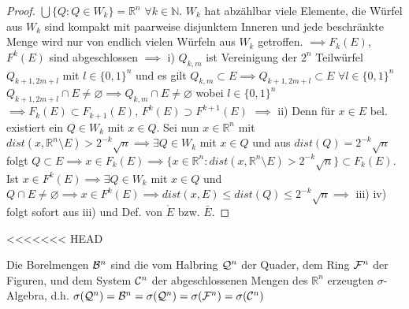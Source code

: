   \begin{proof}
    $\bigcup\{Q:Q\in W_k\} = \mathbb{R}^n$ $\forall k\in\mathbb{N}$. \newline
    $W_k$ hat abzählbar viele Elemente, die Würfel aus $W_k$ sind kompakt mit paarweise disjunktem Inneren und jede beschränkte Menge wird nur von endlich vielen Würfeln aus $W_k$ getroffen. $\implies F_k(E)$, $F^k(E)$ sind abgeschlossen $\implies$ i) \newline
    $Q_{k,m}$ ist Vereinigung der $2^n$ Teilwürfel $Q_{k+1, 2m+l}$ mit $l\in \{0,1\}^n$ und es gilt \newline $Q_{k,m} \subset E \implies Q_{k+1, 2m+l} \subset E$ $\forall l\in\{0,1\}^n$ \newline
    $Q_{k+1,2m+l} \cap E \neq \varnothing \implies Q_{k,m} \cap E \neq \varnothing$ wobei $l\in\{0,1\}^n$ \newline
    $\implies F_k(E) \subset F_{k+1}(E)$, $F^k(E) \supset F^{k+1}(E)$ $\implies$ ii) \newline
    Denn für $x \in E$ bel. existiert ein $Q\in W_k$ mit $x\in Q$. \newline
    Sei nun $x\in\mathbb{R}^n$ mit $dist(x,\mathbb{R}^n\setminus E) > 2^{-k}\sqrt{n} \implies \exists Q\in W_k$ mit $x\in Q$ und aus $dist(Q) = 2^{-k}\sqrt{n}$ folgt $Q\subset E \implies x\in F_k(E)\implies \{x\in\mathbb{R}^n: dist(x,\mathbb{R}^n\setminus E) > 2^{-k}\sqrt{n}\} \subset F_k(E)$. \newline
    Ist $x\in F^k(E) \implies \exists Q\in W_k$ mit $x\in Q$ und $Q \cap E \neq \varnothing \implies x\in F^k(E) \implies dist(x,E) \leq dist(Q) \leq 2^{-k}\sqrt{n} \implies$ iii) \newline
    iv) folgt sofort aus iii) und Def. von $\mathring{E}$ bzw. $\bar{E}$. 
    
  \end{proof}

<<<<<<< HEAD
\begin{lemma}
	Die Borelmengen $\mathcal{B}^n$ sind die vom Halbring $\mathcal{Q}^n$ der Quader, dem Ring $\mathcal{F}^n$ der Figuren, und dem System $\mathcal{C}^n$ der abgeschlossenen Mengen des $\mathbb{R}^n$ erzeugten $\sigma$-Algebra, d.h. $\sigma(\mathcal{Q}^n) = \mathcal{B}^n = \sigma(\mathcal{Q}^n) = \sigma(\mathcal{F}^n) = \sigma(\mathcal{C}^n)$
\end{lemma}

